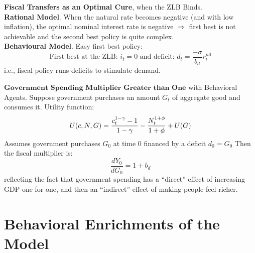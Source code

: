 \documentclass{beamer}
\newcommand\ReduceFont{\fontsize{10}{7.2}\selectfont}
\begin{document}
\begin{frame}{\subsecname}
    \textbf{Fiscal Transfers as an Optimal Cure}, when the ZLB Binds. \\
    \hfill \linebreak
    \textbf{Rational Model}. When the natural rate becomes negative (and with low inflation), the optimal nominal interest rate is negative $\Rightarrow$ first best is not achievable and the second best policy is quite complex.\\
    \hfill \linebreak
    \textbf{Behavioural Model}. Easy first best policy:
    \begin{equation}\tag{47}
        \text{First best at the ZLB: } i_{t}=0 \text{ and deficit: } d_{t}=\frac{-\sigma}{b_{d}}r_{t}^{n0}
    \end{equation}
    i.e., fiscal policy runs deficits to stimulate demand.
\end{frame}

\begin{frame}{\subsecname}
    $\textbf{Government Spending Multiplier Greater than One}$ with Behavioral Agents. Suppose government purchases an amount $G_{t}$ of aggregate good and consumes it. Utility function:
    \begin{equation}\notag
        U(c,N,G) = \frac{c_{t}^{1-\gamma}-1}{1-\gamma} - \frac{N_{t}^{1+\phi}}{1+\phi}+U(G)
    \end{equation}
    Assumes government purchases $G_{0}$ at time 0 financed by a deficit $d_{0}=G_{0}$
    Then the fiscal multiplier is:
    \begin{equation}
        \frac{d Y_{0}}{d G_{0}}=1+b_{d}
    \end{equation}
    reflecting the fact that government spending has a “direct” effect of increasing GDP one-for-one, and then an “indirect” effect of making people feel richer.
\end{frame}

\section{Behavioral Enrichments of the Model}

\begin{frame}
    \ReduceFont
\end{frame}

\begin{frame}
    \tableofcontents[currentsection, hideothersubsections, sections=\value{section}]
\end{frame}
\end{document}
